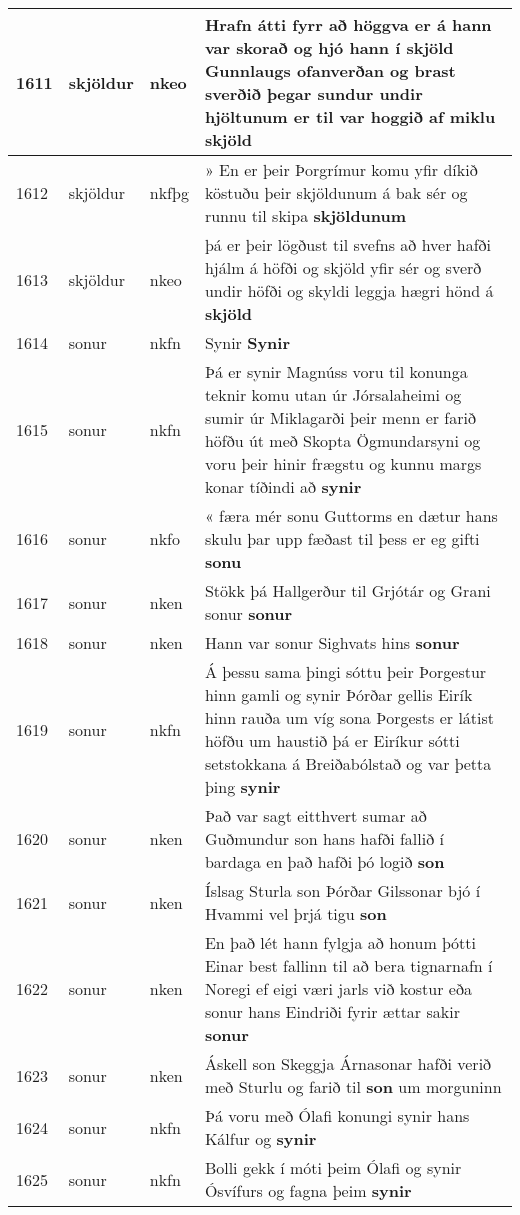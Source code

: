 \documentclass{article}
\begin{document}
\begin{longtable}{p{1cm}|p{1cm}|p{1cm}|p{13cm}}
\hline
1611&skjöldur&nkeo&Hrafn átti fyrr að höggva er á hann var skorað og hjó hann í skjöld Gunnlaugs ofanverðan og brast sverðið þegar sundur undir hjöltunum er til var hoggið af miklu \textbf{skjöld} \\
\hline
1612&skjöldur&nkfþg&» En er þeir Þorgrímur komu yfir díkið köstuðu þeir skjöldunum á bak sér og runnu til skipa \textbf{skjöldunum} \\
\hline
1613&skjöldur&nkeo&þá er þeir lögðust til svefns að hver hafði hjálm á höfði og skjöld yfir sér og sverð undir höfði og skyldi leggja hægri hönd á \textbf{skjöld} \\
\hline
1614&sonur&nkfn&Synir \textbf{Synir} \\
\hline
1615&sonur&nkfn&Þá er synir Magnúss voru til konunga teknir komu utan úr Jórsalaheimi og sumir úr Miklagarði þeir menn er farið höfðu út með Skopta Ögmundarsyni og voru þeir hinir frægstu og kunnu margs konar tíðindi að \textbf{synir} \\
\hline
1616&sonur&nkfo&« færa mér sonu Guttorms en dætur hans skulu þar upp fæðast til þess er eg gifti \textbf{sonu} \\
\hline
1617&sonur&nken&Stökk þá Hallgerður til Grjótár og Grani sonur \textbf{sonur} \\
\hline
1618&sonur&nken&Hann var sonur Sighvats hins \textbf{sonur} \\
\hline
1619&sonur&nkfn&Á þessu sama þingi sóttu þeir Þorgestur hinn gamli og synir Þórðar gellis Eirík hinn rauða um víg sona Þorgests er látist höfðu um haustið þá er Eiríkur sótti setstokkana á Breiðabólstað og var þetta þing \textbf{synir} \\
\hline
1620&sonur&nken&Það var sagt eitthvert sumar að Guðmundur son hans hafði fallið í bardaga en það hafði þó logið \textbf{son} \\
\hline
1621&sonur&nken&Íslsag Sturla son Þórðar Gilssonar bjó í Hvammi vel þrjá tigu \textbf{son} \\
\hline
1622&sonur&nken&En það lét hann fylgja að honum þótti Einar best fallinn til að bera tignarnafn í Noregi ef eigi væri jarls við kostur eða sonur hans Eindriði fyrir ættar sakir \textbf{sonur} \\
\hline
1623&sonur&nken&Áskell son Skeggja Árnasonar hafði verið með Sturlu og farið til \textbf{son} um morguninn\\
\hline
1624&sonur&nkfn&Þá voru með Ólafi konungi synir hans Kálfur og \textbf{synir} \\
\hline
1625&sonur&nkfn&Bolli gekk í móti þeim Ólafi og synir Ósvífurs og fagna þeim \textbf{synir} \\

\end{longtable}
\end{document}
